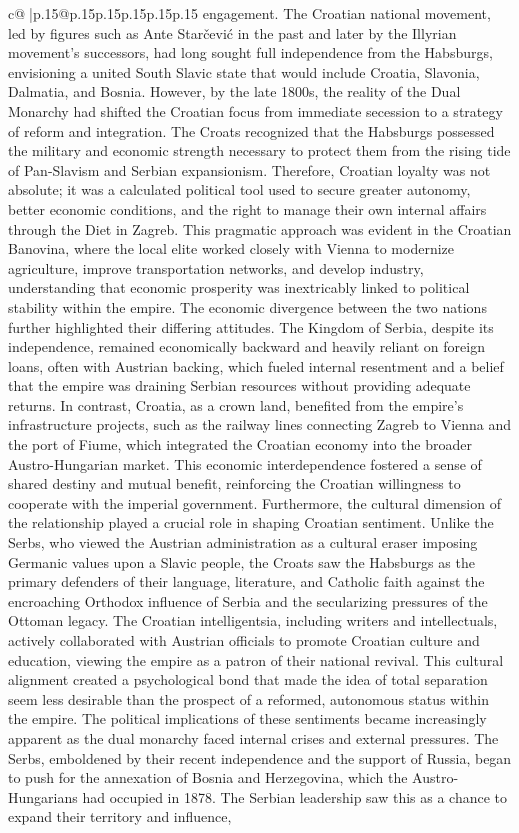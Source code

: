 \documentclass{article}
\begin{document}
{\begin{supertabular}{c@{$\;$}|p{.15\linewidth}@{}p{.15\linewidth}p{.15\linewidth}p{.15\linewidth}p{.15\linewidth}p{.15\linewidth}}
{{{engagement. The Croatian national movement, led by figures such as Ante Starčević in the past and later by the Illyrian movement's successors, had long sought full independence from the Habsburgs, envisioning a united South Slavic state that would include Croatia, Slavonia, Dalmatia, and Bosnia. However, by the late 1800s, the reality of the Dual Monarchy had shifted the Croatian focus from immediate secession to a strategy of reform and integration. The Croats recognized that the Habsburgs possessed the military and economic strength necessary to protect them from the rising tide of Pan{-}Slavism and Serbian expansionism. Therefore, Croatian loyalty was not absolute; it was a calculated political tool used to secure greater autonomy, better economic conditions, and the right to manage their own internal affairs through the Diet in Zagreb. This pragmatic approach was evident in the Croatian Banovina, where the local elite worked closely with Vienna to modernize agriculture, improve transportation networks, and develop industry, understanding that economic prosperity was inextricably linked to political stability within the empire. The economic divergence between the two nations further highlighted their differing attitudes. The Kingdom of Serbia, despite its independence, remained economically backward and heavily reliant on foreign loans, often with Austrian backing, which fueled internal resentment and a belief that the empire was draining Serbian resources without providing adequate returns. In contrast, Croatia, as a crown land, benefited from the empire's infrastructure projects, such as the railway lines connecting Zagreb to Vienna and the port of Fiume, which integrated the Croatian economy into the broader Austro{-}Hungarian market. This economic interdependence fostered a sense of shared destiny and mutual benefit, reinforcing the Croatian willingness to cooperate with the imperial government. Furthermore, the cultural dimension of the relationship played a crucial role in shaping Croatian sentiment. Unlike the Serbs, who viewed the Austrian administration as a cultural eraser imposing Germanic values upon a Slavic people, the Croats saw the Habsburgs as the primary defenders of their language, literature, and Catholic faith against the encroaching Orthodox influence of Serbia and the secularizing pressures of the Ottoman legacy. The Croatian intelligentsia, including writers and intellectuals, actively collaborated with Austrian officials to promote Croatian culture and education, viewing the empire as a patron of their national revival. This cultural alignment created a psychological bond that made the idea of total separation seem less desirable than the prospect of a reformed, autonomous status within the empire. The political implications of these sentiments became increasingly apparent as the dual monarchy faced internal crises and external pressures. The Serbs, emboldened by their recent independence and the support of Russia, began to push for the annexation of Bosnia and Herzegovina, which the Austro{-}Hungarians had occupied in 1878. The Serbian leadership saw this as a chance to expand their territory and influence, }}}
\end{supertabular}}
\end{document}
